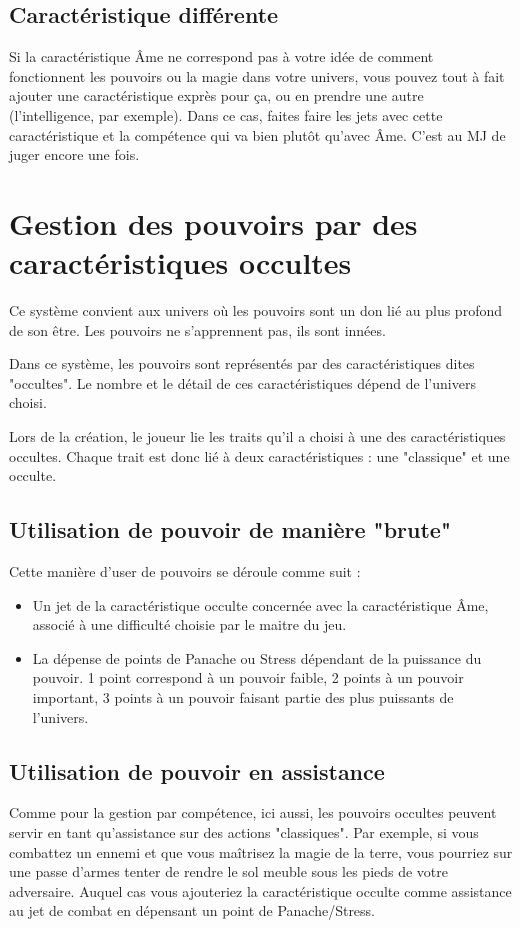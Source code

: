 \documentclass{conf/FusinaClass}
\begin{document}
\section{Caractéristique différente}
Si la caractéristique Âme ne correspond pas à votre idée de comment fonctionnent les pouvoirs ou la magie dans votre univers, vous pouvez tout à fait ajouter une caractéristique exprès pour ça, ou en prendre une autre (l'intelligence, par exemple). Dans ce cas, faites faire les jets avec cette caractéristique et la compétence qui va bien plutôt qu'avec Âme. C'est au MJ de juger encore une fois.

\chapter{Gestion des pouvoirs par des caractéristiques occultes}
Ce système convient aux univers où les pouvoirs sont un don lié au plus profond de son être. Les pouvoirs ne s'apprennent pas, ils sont innées.

Dans ce système, les pouvoirs sont représentés par des caractéristiques dites "occultes". Le nombre et le détail de ces caractéristiques dépend de l'univers choisi. 

Lors de la création, le joueur lie les traits qu'il a choisi à une des caractéristiques occultes. Chaque trait est donc lié à deux caractéristiques : une "classique" et une occulte.

\section{Utilisation de pouvoir de manière "brute"}
Cette manière d'user de pouvoirs se déroule comme suit : 

\begin{itemize}
\item Un jet de la caractéristique occulte concernée avec la caractéristique Âme, associé à une difficulté choisie par le maitre du jeu.
\item La dépense de points de Panache ou Stress dépendant de la puissance du pouvoir. 1 point correspond à un pouvoir faible, 2 points à un pouvoir important, 3 points à un pouvoir faisant partie des plus puissants de l'univers.
\end{itemize}

\section{Utilisation de pouvoir en assistance}
Comme pour la gestion par compétence, ici aussi, les pouvoirs occultes peuvent servir en tant qu'assistance sur des actions "classiques". Par exemple, si vous combattez un ennemi et que vous maîtrisez la magie de la terre, vous pourriez sur une passe d'armes tenter de rendre le sol meuble sous les pieds de votre adversaire. Auquel cas vous ajouteriez la caractéristique occulte comme assistance au jet de combat en dépensant un point de Panache/Stress.
\end{document}
